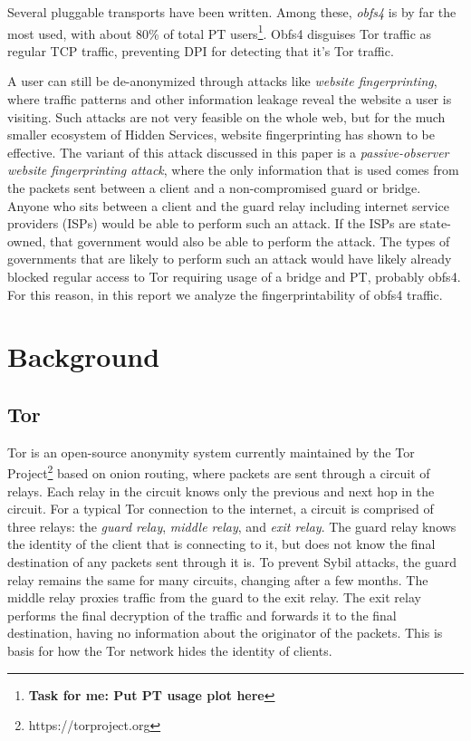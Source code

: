 \documentclass[11pt]{article}
\begin{document}
Several pluggable transports have been written. Among these, \textit{obfs4} is by far the most used, with about 80\% of total PT users\footnote{\textbf{Task for me: Put PT usage plot here}}.
Obfs4 disguises Tor traffic as regular TCP traffic, preventing DPI for detecting that it's Tor traffic.

A user can still be de-anonymized through attacks like \textit{website fingerprinting}, where traffic patterns and other information leakage reveal the website a user is visiting. Such attacks are not very feasible on the whole web, but for the much smaller ecosystem of Hidden Services, website fingerprinting has shown to be effective\cite{panchenko, wang}.
The variant of this attack discussed in this paper is a \textit{passive-observer website fingerprinting attack}, where the only information that is used comes from the packets sent between a client and a non-compromised guard or bridge. Anyone who sits between a client and the guard relay including internet service providers (ISPs) would be able to perform such an attack. If the ISPs are state-owned, that government would also be able to perform the attack. The types of governments that are likely to perform such an attack would have likely already blocked regular access to Tor requiring usage of a bridge and PT, probably obfs4. For this reason, in this report we analyze the fingerprintability of obfs4 traffic.

\section{Background}
\subsection{Tor}
Tor is an open-source anonymity system currently maintained by the Tor Project\footnote{https://torproject.org} based on onion routing, where packets are sent through a circuit of relays. Each relay in the circuit knows only the previous and next hop in the circuit. For a typical Tor connection to the internet, a circuit is comprised of three relays: the \textit{guard relay}, \textit{middle relay}, and \textit{exit relay}. The guard relay knows the identity of the client that is connecting to it, but does not know the final destination of any packets sent through it is. To prevent Sybil attacks, the guard relay remains the same for many circuits, changing after a few months\cite{sybil}. The middle relay proxies traffic from the guard to the exit relay. The exit relay performs the final decryption of the traffic and forwards it to the final destination, having no information about the originator of the packets.
This is basis for how the Tor network hides the identity of clients.
\end{document}

